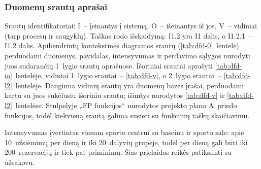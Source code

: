 \clearpage
\subsubsection{Duomenų srautų aprašai}\label{sec:dfd-srautai}

Srautų identifikatoriai: I~– įeinantys į sistemą, O~– išeinantys iš jos,
V~– vidiniai (tarp procesų ir saugyklų). Taškas rodo išskaidymą: I1.2 yra I1
dalis, o I1.2.1~– I1.2 dalis. Apibendrintų kontekstinės diagramos srautų
(\ref{tab:dfd-0}~lentelė) perduodami duomenys, pavidalas, intensyvumas ir
perdavimo sąlygos nurodyti juos sudarančių 1~lygio srautų aprašuose. Išoriniai srautai aprašyti
\ref{tab:dfd-io}~lentelėje, vidiniai 1~lygio srautai~– \ref{tab:dfd-v},
o 2~lygio srautai~– \ref{tab:dfd-l2}~lentelėje. Dauguma vidinių srautų yra
duomenų bazės įrašai, perduodami kartu su juos sukėlusiu išoriniu srautu;
išimtys nurodytos \ref{tab:dfd-v} ir \ref{tab:dfd-l2}~lentelėse. Stulpelyje
„FP funkcijos“ nurodytos projekto plano A~priedo funkcijos, todėl kiekvieną
srautą galima susieti su funkcinių taškų skaičiavimu.

Intensyvumas įvertintas vienam sporto centrui su baseinu ir sporto sale:
apie 10~užsiėmimų per dieną ir iki 20~dalyvių grupėje, todėl per dieną gali
būti iki 200~rezervacijų ir tiek pat priminimų. Šias prielaidas reikės
patikslinti su užsakovu.

